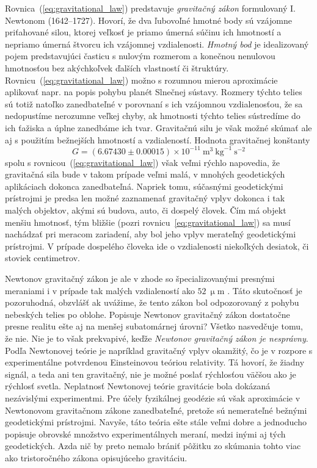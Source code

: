 \documentclass[a4paper, 12pt]{book}
\begin{document}
Rovnica~(\ref{eq:gravitational_law}) predstavuje \emph{gravitačný zákon} formulovaný 
I. Newtonom (1642--1727).  Hovorí, že dva ľubovoľné hmotné body sú vzájomne 
priťahované silou, ktorej veľkosť je priamo úmerná súčinu ich hmotností 
a nepriamo úmerná štvorcu ich vzájomnej vzdialenosti.  \emph{Hmotný bod} je 
idealizovaný pojem predstavujúci časticu s nulovým rozmerom a konečnou 
nenulovou hmotnosťou bez akýchkoľvek ďalších vlastností či štruktúry.  
Rovnicu~(\ref{eq:gravitational_law}) možno s rozumnou mierou aproximácie aplikovať 
napr. na popis pohybu planét Slnečnej sústavy.  Rozmery týchto telies sú totiž 
natoľko zanedbateľné v porovnaní s ich vzájomnou vzdialenosťou, že sa 
nedopustíme nerozumne veľkej chyby, ak hmotnosti týchto telies sústredíme do 
ich ťažiska a úplne zanedbáme ich tvar.  Gravitačnú silu je však možné skúmať 
ale aj s použitím bežnejších hmotností a vzdialeností.  Hodnota gravitačnej 
konštanty
%
\begin{equation}
G = (6.67430 \pm 0.00015) \times 10^{-11} \ \mathrm{m}^3 \ \mathrm{kg}^{-1} 
\ \mathrm{s}^{-2}
\end{equation}
%
spolu s rovnicou~(\ref{eq:gravitational_law}) však veľmi rýchlo napovedia, že 
gravitačná sila bude v takom prípade veľmi malá, v mnohých geodetických 
aplikáciach dokonca zanedbateľná.  Napriek tomu, súčasnými geodetickými 
prístrojmi je predsa len možné zaznamenať gravitačný vplyv dokonca i tak malých 
objektov, akými sú budova, auto, či dospelý človek.  Čím má objekt menšiu 
hmotnosť, tým bližšie (pozri rovnicu~\ref{eq:gravitational_law}) sa musí nachádzať 
pri meracom zariadení, aby bol jeho vplyv merateľný geodetickými prístrojmi.  
V prípade dospelého človeka ide o vzdialenosti niekoľkých desiatok, či stoviek 
centimetrov.

Newtonov gravitačný zákon je ale v zhode so špecializovanými presnými meraniami 
i v prípade tak malých vzdialeností ako $52\ \upmu\mathrm{m}$ \citep{Lee2020}.  
Táto skutočnosť je pozoruhodná, obzvlášť ak uvážime, že tento zákon bol 
odpozorovaný z pohybu nebeských telies po oblohe.  Popisuje Newtonov gravitačný 
zákon dostatočne presne realitu ešte aj na menšej subatomárnej úrovni?  Všetko 
nasvedčuje tomu, že nie.  Nie je to však prekvapivé, keďže \emph{Newtonov 
gravitačný zákon je nesprávny}.  Podľa Newtonovej teórie je napríklad 
gravitačný vplyv okamžitý, čo je v rozpore s experimentálne potvrdenou 
Einsteinovou teóriou relativity.  Tá hovorí, že žiadny signál, a teda ani ten 
gravitačný, nie je možné poslať rýchlosťou väčšou ako je rýchlosť svetla.  
Neplatnosť Newtonovej teórie gravitácie bola dokázaná nezávislými experimentmi.  
Pre účely fyzikálnej geodézie sú však aproximácie v Newtonovom gravitačnom 
zákone zanedbateľné, pretože sú nemerateľné bežnými geodetickými prístrojmi.  
Navyše, táto teória ešte stále veľmi dobre a jednoducho popisuje obrovské 
množstvo experimentálnych meraní, medzi inými aj tých geodetických.  Azda nič 
by preto nemalo brániť pôžitku zo skúmania tohto viac ako tristoročného zákona 
opisujúceho gravitáciu.
\end{document}
